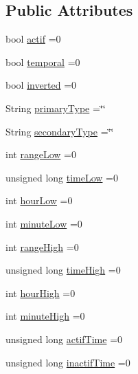 \subsection*{Public Attributes}
\begin{DoxyCompactItemize}
\item 
bool \hyperlink{struct_cool_board_actor_1_1state_a7963178c2de01ef0d2861f9f59ad6f3c}{actif} =0
\item 
bool \hyperlink{struct_cool_board_actor_1_1state_a6442a8c3a30abc48472f3e5284b786ea}{temporal} =0
\item 
bool \hyperlink{struct_cool_board_actor_1_1state_aa4fdca81973fd7b29541877db1cf27bd}{inverted} =0
\item 
String \hyperlink{struct_cool_board_actor_1_1state_a8a0b318fd2814cf67fe74ee8164df55e}{primary\+Type} =\char`\"{}\char`\"{}
\item 
String \hyperlink{struct_cool_board_actor_1_1state_a44e8f69868f2491b79ed075f84aa0fcb}{secondary\+Type} =\char`\"{}\char`\"{}
\item 
int \hyperlink{struct_cool_board_actor_1_1state_a43f891c9fb3bb63575c27cec860de55a}{range\+Low} =0
\item 
unsigned long \hyperlink{struct_cool_board_actor_1_1state_a314c53c146e8c7b12c025323a34fbb9a}{time\+Low} =0
\item 
int \hyperlink{struct_cool_board_actor_1_1state_ae7034bf95b36f1392f9de076fa0c8c0f}{hour\+Low} =0
\item 
int \hyperlink{struct_cool_board_actor_1_1state_acbcc2902331fd9d757cd475eb403bdd9}{minute\+Low} =0
\item 
int \hyperlink{struct_cool_board_actor_1_1state_a6e5cd6c5cd44e2decfd8d4df1853f8e3}{range\+High} =0
\item 
unsigned long \hyperlink{struct_cool_board_actor_1_1state_a54cd4976b56aeaa6274fe0576aaebb0f}{time\+High} =0
\item 
int \hyperlink{struct_cool_board_actor_1_1state_acd1af3ac2382258a5b05497d814adc01}{hour\+High} =0
\item 
int \hyperlink{struct_cool_board_actor_1_1state_a4bff3d61ead74adb60be224764b93006}{minute\+High} =0
\item 
unsigned long \hyperlink{struct_cool_board_actor_1_1state_a534119a22a09b29ecb446b277d5b2ef5}{actif\+Time} =0
\item 
unsigned long \hyperlink{struct_cool_board_actor_1_1state_a6d88835f4402b3b81cd404784281854b}{inactif\+Time} =0
\end{DoxyCompactItemize}


